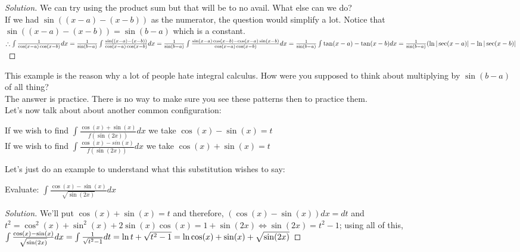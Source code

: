 \begin{proof}
    [Solution]
    We can try using the product sum but that will be to no avail. What else can we do?\\
    If we had $\sin((x-a)-(x-b))$ as the numerator, the question would simplify a lot. Notice that $\sin((x-a)-(x-b))=\sin(b-a)$ which is a constant.\\
    $\therefore \int \frac{1}{\cos(x-a)\cos(x-b)} dx\\
    = \frac{1}{\sin(b-a)}\int\frac{\sin((x-a)-(x-b))}{\cos(x-a)\cos(x-b)}dx\\
    = \frac{1}{\sin(b-a)}\int\frac{\sin(x-a)\cos(x-b)-\cos(x-a)\sin(x-b)}{\cos(x-a)\cos(x-b)}dx\\
    = \frac{1}{\sin(b-a)}\int \tan(x-a)-\tan(x-b) dx\\
    = \frac{1}{\sin(b-a)}(\ln{|\sec(x-a)|}-\ln{|\sec(x-b)|}\\
    $
\end{proof}
This example is the reason why a lot of people hate integral calculus. How were you supposed to think about multiplying by $\sin(b-a)$ of all thing?\\
The answer is practice. There is no way to make sure you see these patterns then to practice them.\\
Let's now talk about about another common configuration:\\
\begin{theorem}
    If we wish to find $\int \frac{\cos(x)+\sin(x)}{f(\sin(2x))}dx$ we take $\cos(x)-\sin(x)=t$\\
    If we wish to find $\int \frac{\cos(x)-sin(x)}{f(\sin(2x))}dx$ we take $\cos(x)+\sin(x)=t$
\end{theorem}
Let's just do an example to understand what this substitution wishes to say:\\
\begin{example}
    Evaluate: $\int \frac{\cos(x)-\sin(x)}{\sqrt{\sin(2x)}}dx$
\end{example}
\begin{proof}
    [Solution]
    We'll put $\cos(x)+\sin(x)=t$ and therefore, $(\cos(x)-\sin(x))dx=dt$ and $t^2=\cos^2(x)+\sin^2(x)+2\sin(x)\cos(x)=1+\sin(2x) \iff \sin(2x)=t^2-1$; using all of this,\\
    $\int \frac{\cos(x)-\sin(x)}{\sqrt{\sin(2x)}}dx\\
    = \int \frac{1}{\sqrt{t^2-1}}dt\\
    = \ln{t+\sqrt{t^2-1}}\\
    = \ln{\cos(x)+\sin(x)+\sqrt{\sin(2x)}}$
\end{proof}
